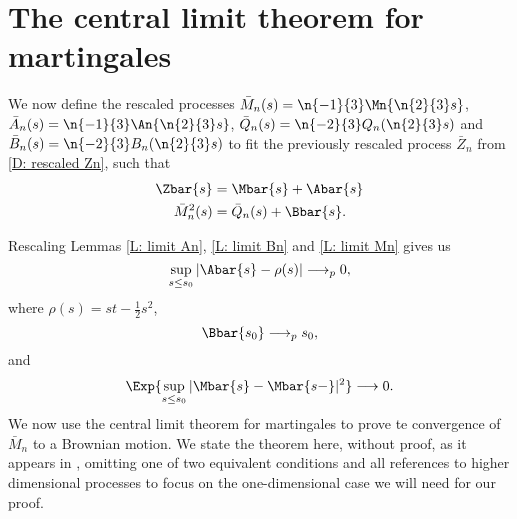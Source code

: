 \section{The central limit theorem for martingales}

We now define the rescaled processes 
$\bar{M}_n(s) = \n{-1}{3}\Mn{\n{2}{3}s}$, 
$\bar{A}_n(s) = \n{-1}{3}\An{\n{2}{3}s}$, 
$\bar{Q}_n(s) = \n{-2}{3}Q_n(\n{2}{3}s)$ and 
$\bar{B}_n(s) = \n{-2}{3}B_n(\n{2}{3}s)$ to fit the previously rescaled process 
$\bar{Z}_n$ from \ref{D: rescaled Zn}, such that
\begin{align*}
\Zbar{s} &= \Mbar{s} + \Abar{s} \\
\bar{M}_n^2(s) &= \bar{Q}_n(s) + \Bbar{s}.
\end{align*}

Rescaling Lemmas \ref{L: limit An}, \ref{L: limit Bn} and \ref{L: limit Mn} gives us
\begin{equation} \label{E: limit An rescaled}
\sup_{s \leq s_0} |\Abar{s} - \rho (s)| \longrightarrow_p 0,
\end{equation}
where $\rho (s) = st - \frac{1}{2}s^2$,
\begin{equation} \label{E: limit Bn rescaled}
\Bbar{s_0} \longrightarrow_p s_0,
\end{equation}
and
\begin{equation} \label{E: limit Mn rescaled}
\Exp{\sup_{s \leq s_0} | \Mbar{s} - \Mbar{s-} |^2 } \longrightarrow 0.
\end{equation}
We now use the central limit theorem for martingales to prove te convergence of $\bar{M}_n$ to a Brownian motion.
We state the theorem here, without proof, as it appears in \cite[p. 339 f.]{N.Ethier1986},
omitting one of two equivalent conditions and all references to higher dimensional processes to focus on the one-dimensional case we will need for our proof.

